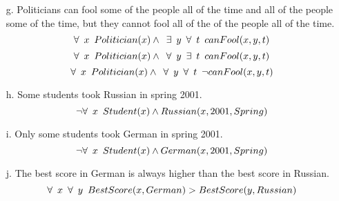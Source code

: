 \documentclass[11pt]{article}
\begin{document}
\begin{flushleft}
\begin{enumerate}
    \item[g.] Politicians can fool some of the people all of the time and all
        of the people some of the time, but they cannot fool all of the
        of the people all of the time.
        $$ \forall \hspace{0.5em} x \hspace{0.5em} Politician(x) \wedge
        \hspace{0.5em} \exists \hspace{0.5em} y \hspace{0.5em} \forall \hspace{0.5em} t
        \hspace{0.5em} canFool(x, y, t) $$
        $$ \forall \hspace{0.5em} x \hspace{0.5em} Politician(x) \wedge
        \hspace{0.5em} \forall \hspace{0.5em} y \hspace{0.5em} \exists \hspace{0.5em} t
        \hspace{0.5em} canFool(x, y, t) $$
        $$ \forall \hspace{0.5em} x \hspace{0.5em} Politician(x) \wedge
        \hspace{0.5em} \forall \hspace{0.5em} y \hspace{0.5em} \forall \hspace{0.5em} t
        \hspace{0.5em} \neg canFool(x, y, t) $$

    \item[h.] Some students took Russian in spring 2001.
        $$ \neg \forall \hspace{0.5em} x \hspace{0.5em} Student(x) \wedge
        Russian(x, 2001, Spring) $$

    \item[i.] Only some students took German in spring 2001.
        $$ \neg \forall \hspace{0.5em} x \hspace{0.5em} Student(x) \wedge
        German(x, 2001, Spring) $$

    \item[j.] The best score in German is always higher than the best score
        in Russian.
        $$ \forall \hspace{0.5em} x \hspace{0.5em} \forall \hspace{0.5em} y
        \hspace{0.5em} BestScore(x, German) > BestScore(y, Russian) $$


\end{enumerate}
\end{flushleft}
\end{document}
